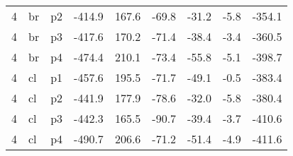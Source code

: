 \documentclass[a4paper]{article}
\begin{document}
\begin{table}[ht]
\begin{tabular}{rllrrrrrr}
   4 & br & p2 & -414.9 & 167.6 & -69.8 & -31.2 & -5.8 & -354.1 \\ 
   4 & br & p3 & -417.6 & 170.2 & -71.4 & -38.4 & -3.4 & -360.5 \\ 
   4 & br & p4 & -474.4 & 210.1 & -73.4 & -55.8 & -5.1 & -398.7 \\ 
   4 & cl & p1 & -457.6 & 195.5 & -71.7 & -49.1 & -0.5 & -383.4 \\ 
   4 & cl & p2 & -441.9 & 177.9 & -78.6 & -32.0 & -5.8 & -380.4 \\ 
   4 & cl & p3 & -442.3 & 165.5 & -90.7 & -39.4 & -3.7 & -410.6 \\ 
   4 & cl & p4 & -490.7 & 206.6 & -71.2 & -51.4 & -4.9 & -411.6 \\ 
   \hline
\end{tabular}
\end{table}
\end{document}
